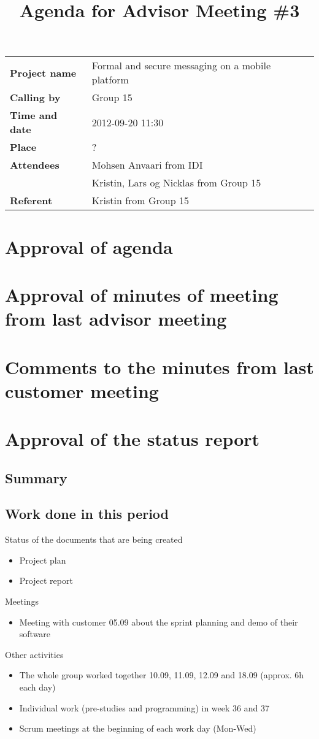 \documentclass[a4paper,12pt]{article}
\begin{document}
\title{Agenda for Advisor Meeting \#3}
\maketitle
\begin{tabular}{>{\bfseries}l l}	
Project name&Formal and secure messaging on a mobile platform\\
Calling by&Group 15\\
Time and date&2012-09-20 11:30\\
Place&?\\
Attendees&Mohsen Anvaari from IDI\\
 & Kristin, Lars og Nicklas from Group 15\\
Referent&Kristin from Group 15\\
\end{tabular}

\section{Approval of agenda}
\section{Approval of minutes of meeting from last advisor meeting}
\section{Comments to the minutes from last customer meeting}
\section{Approval of the status report}
\subsection{Summary}
\subsection{Work done in this period}
Status of the documents that are being created
\begin{itemize}
\item
Project plan
\item
Project report
\end{itemize}
Meetings
\begin{itemize}
\item
Meeting with customer 05.09 about the sprint planning and demo of their software
\end{itemize}
Other activities
\begin{itemize}
\item
The whole group worked together 10.09, 11.09, 12.09 and 18.09 (approx. 6h each day)
\item
Individual work (pre-studies and programming) in week 36 and 37
\item
Scrum meetings at the beginning of each work day (Mon-Wed)
\end{itemize}
\end{document}
